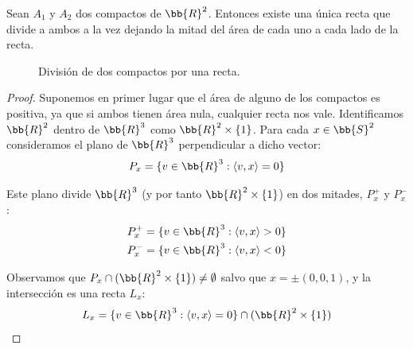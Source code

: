 \begin{teo}
    Sean $A_1$ y $A_2$ dos compactos de $\bb{R}^2$. Entonces existe una única recta que divide a ambos a la vez dejando la mitad del área de cada uno a cada lado de la recta.

    \begin{figure}[ht]
        \centering
        \caption{División de dos compactos por una recta.}
        \label{fig:teorema_tortitas}
    \end{figure}

    \begin{proof}
        Suponemos en primer lugar que el área de alguno de los compactos es positiva, ya que si ambos tienen área nula, cualquier recta nos vale. Identificamos $\bb{R}^2$ dentro de $\bb{R}^3$ como $\bb{R}^2 \times \{1\}$. Para cada $x\in \bb{S}^2$ consideramos el plano de $\bb{R}^3$ perpendicular a dicho vector:
        \begin{equation*}
            P_x = \{v\in \bb{R}^3 : \langle v,x \rangle = 0\}
        \end{equation*}
        
        Este plano divide $\bb{R}^3$ (y por tanto $\bb{R}^2\times \{1\}$) en dos mitades, $P_x^+$ y $P_x^-$:
        \begin{gather*}
            P_x^+ = \{v\in \bb{R}^3 : \langle v,x \rangle > 0\}\\
            P_x^- = \{v\in \bb{R}^3 : \langle v,x \rangle < 0\}
        \end{gather*}

        Observamos que $P_x\cap (\bb{R}^2\times\{1\})\neq \emptyset$ salvo que $x=\pm (0,0,1)$, y la intersección es una recta $L_x$:
        \begin{equation*}
            L_x = \{v\in \bb{R}^3 : \langle v,x \rangle = 0\} \cap (\bb{R}^2\times\{1\})
        \end{equation*}


\end{proof}
\end{teo}
